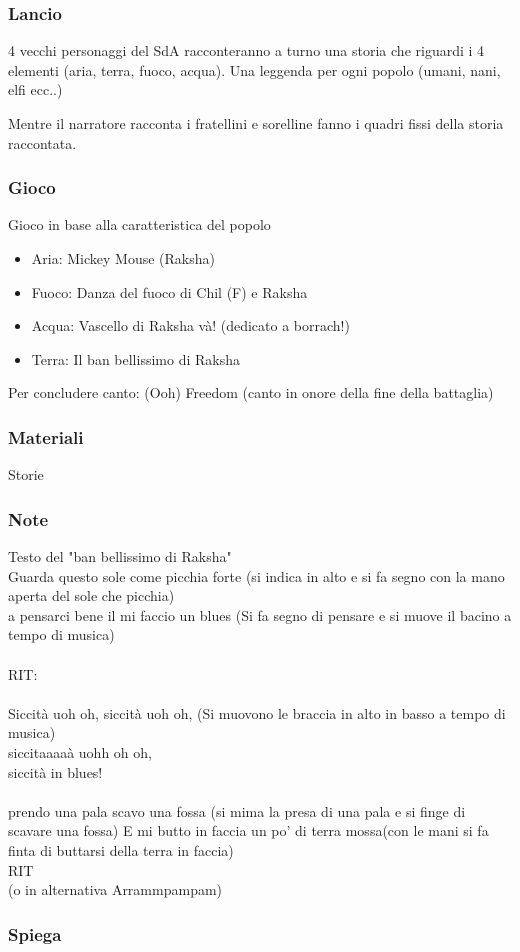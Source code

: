 \documentclass[../main.tex]{subfiles}
\begin{document}
        \subsubsection{Lancio}
        4 vecchi personaggi del SdA racconteranno a turno una storia che riguardi i 4 elementi (aria, terra, fuoco, acqua).    
        Una leggenda per ogni popolo (umani, nani, elfi ecc..)

        Mentre il narratore racconta i fratellini e sorelline fanno i quadri fissi della storia raccontata.

        \subsubsection{Gioco}
        Gioco in base alla caratteristica del popolo
        \begin{itemize}
            \item Aria: Mickey Mouse (Raksha)
            \item Fuoco: Danza del fuoco di Chil (F) e Raksha 
            \item Acqua: Vascello di Raksha và! 	(dedicato a borrach!)
            \item Terra: Il ban bellissimo di Raksha
        \end{itemize}
        Per concludere canto: (Ooh) Freedom (canto in onore della fine della battaglia)
        
        \subsubsection{Materiali}
        Storie
        \subsubsection{Note}
        Testo del "ban bellissimo di Raksha"\\
        
        Guarda questo sole come picchia forte (si indica in alto e si fa segno con la mano aperta del sole che picchia)\\
        a pensarci bene il mi faccio un blues (Si fa segno di pensare e si muove il bacino a tempo di musica)\\
        \\
        RIT:\\
        \\
        Siccità uoh oh, siccità uoh oh, (Si muovono le braccia in alto in basso a tempo di musica)\\
        siccitaaaaà uohh oh oh,\\
        siccità in blues!\\
        \\
        prendo una pala scavo una fossa (si mima la presa di una pala e si finge di scavare una fossa)
        E mi butto in faccia un po' di terra mossa(con le mani si fa finta di buttarsi della terra in faccia)
        \\
        RIT\\ 
        (o in alternativa Arrammpampam)
        \subsubsection{Spiega}
   
\end{document}
